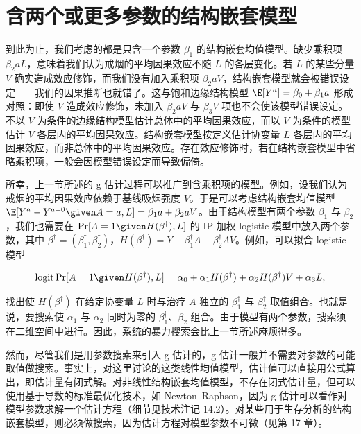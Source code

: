 \section{含两个或更多参数的结构嵌套模型}

到此为止，我们考虑的都是只含一个参数 $\beta_1$ 的结构嵌套均值模型。缺少乘积项 $\beta_2aL$，意味着我们认为戒烟的平均因果效应不随 $L$ 的各层变化。若 $L$ 的某些分量 $V$ 确实造成效应修饰，而我们没有加入乘积项 $\beta_2aV$，结构嵌套模型就会被错误设定——我们的因果推断也就错了。这与饱和边缘结构模型 $\E[Y^a]=\beta_0+\beta_1a$ 形成对照：即使 $V$ 造成效应修饰，未加入 $\beta_2aV$ 与 $\beta_3V$ 项也不会使该模型错误设定。不以 $V$ 为条件的边缘结构模型估计总体中的平均因果效应，而以 $V$ 为条件的模型估计 $V$ 各层内的平均因果效应。结构嵌套模型按定义估计协变量 $L$ 各层内的平均因果效应，而非总体中的平均因果效应。存在效应修饰时，若在结构嵌套模型中省略乘积项，一般会因模型错误设定而导致偏倚。

所幸，上一节所述的 g 估计过程可以推广到含乘积项的模型。例如，设我们认为戒烟的平均因果效应依赖于基线吸烟强度 $V$。于是可以考虑结构嵌套均值模型 $\E[Y^a-Y^{a=0}\given A=a,L]=\beta_1a+\beta_2aV$。由于结构模型有两个参数 $\beta_1$ 与 $\beta_2$，我们也需要在 $\Pr[A=1\given H(\beta^\dagger),L]$ 的 IP 加权 logistic 模型中放入两个参数，其中 $\beta^\dagger=(\beta_1^\dagger,\beta_2^\dagger)$，$H(\beta^\dagger)=Y-\beta_1^\dagger A-\beta_2^\dagger AV$。例如，可以拟合 logistic 模型

\[
\operatorname{logit}\Pr[A=1\given H(\beta^\dagger),L]=\alpha_0+\alpha_1H(\beta^\dagger)+\alpha_2H(\beta^\dagger)V+\alpha_3L,
\]

找出使 $H(\beta^\dagger)$ 在给定协变量 $L$ 时与治疗 $A$ 独立的 $\beta_1^\dagger$ 与 $\beta_2^\dagger$ 取值组合。也就是说，要搜索使 $\alpha_1$ 与 $\alpha_2$ 同时为零的 $\beta_1^\dagger$、$\beta_2^\dagger$ 组合。由于模型有两个参数，搜索须在二维空间中进行。因此，系统的暴力搜索会比上一节所述麻烦得多。


然而，尽管我们是用参数搜索来引入 g 估计的，g 估计一般并不需要对参数的可能取值做搜索。事实上，对这里讨论的这类线性均值模型，估计值可以直接用公式算出，即估计量有闭式解。对非线性结构嵌套均值模型，不存在闭式估计量，但可以使用基于导数的标准最优化技术，如 Newton--Raphson，因为 g 估计可以看作对模型参数求解一个估计方程（细节见技术注记 14.2）。对某些用于生存分析的结构嵌套模型，则必须做搜索，因为估计方程对模型参数不可微（见第 17 章）。

